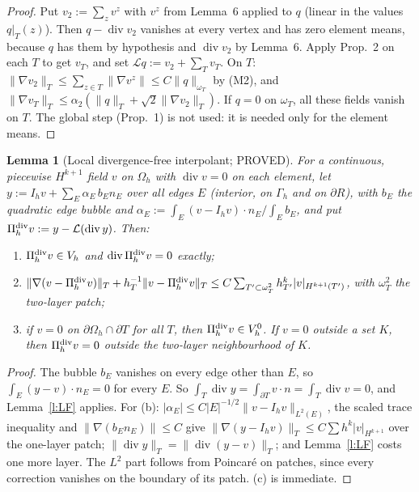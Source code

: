 \documentclass[11pt,reqno]{amsart}
\theoremstyle{plain}
\newtheorem{lemma}[theorem]{Lemma}
\theoremstyle{definition}
\newcommand{\Gh}{\Gamma_h}
\newcommand{\Oh}{\Omega_h}
\newcommand{\Vh}{V_h}
\newcommand{\VO}{V_h^0}
\newcommand{\norm}[1]{\lVert #1\rVert}
\renewcommand{\div}{\operatorname{div}}
\newcommand{\Pz}{\Pi^{\rm div}_h}   %
\begin{document}
\begin{proof}
Put $v_2:=\sum_zv^z$ with $v^z$ from Lemma~6 applied to $q$ (linear in the values $q|_T(z)$). Then $q-\div v_2$ vanishes at every vertex and has zero element means, because $q$ has them by hypothesis and $\div v_2$ by Lemma~6. Apply Prop.~2 on each $T$ to get $v_T$, and set $\mathcal Lq:=v_2+\sum_Tv_T$. On $T$: $\norm{\nabla v_2}_T\le\sum_{z\in T}\norm{\nabla v^z}\le C\norm q_{\omega_T}$ by (M2), and $\norm{\nabla v_T}_T\le\alpha_2(\norm q_T+\sqrt2\norm{\nabla v_2}_T)$. If $q=0$ on $\omega_T$, all these fields vanish on $T$. The global step (Prop.~1) is not used: it is needed only for the element means.
\end{proof}

\begin{lemma}[Local divergence-free interpolant; PROVED]\label{l:Pz}
For a continuous, piecewise $H^{k+1}$ field $v$ on $\Oh$ with $\div v=0$ on each element, let $y:=I_hv+\sum_E\alpha_E\,b_En_E$ over all edges $E$ (interior, on $\Gh$ and on $\partial R$), with $b_E$ the quadratic edge bubble and $\alpha_E:=\int_E(v-I_hv)\cdot n_E/\int_Eb_E$, and put $\Pz v:=y-\mathcal L(\div y)$. Then:
\begin{enumerate}[label=(\alph*)]
\item $\Pz v\in\Vh$ and $\div\Pz v=0$ exactly;
\item $\norm{\nabla(v-\Pz v)}_T+h_T^{-1}\norm{v-\Pz v}_T\le C\sum_{T'\subset\omega^2_T}h_{T'}^k|v|_{H^{k+1}(T')}$, with $\omega^2_T$ the two-layer patch;
\item if $v=0$ on $\partial\Oh\cap\partial T$ for all $T$, then $\Pz v\in\VO$. If $v=0$ outside a set $K$, then $\Pz v=0$ outside the two-layer neighbourhood of $K$.
\end{enumerate}
\end{lemma}

\begin{proof}
The bubble $b_E$ vanishes on every edge other than $E$, so $\int_E(y-v)\cdot n_E=0$ for every $E$. So $\int_T\div y=\int_{\partial T}v\cdot n=\int_T\div v=0$, and Lemma~\ref{l:LF} applies. For (b): $|\alpha_E|\le C|E|^{-1/2}\norm{v-I_hv}_{L^2(E)}$, the scaled trace inequality and $\norm{\nabla(b_En_E)}\le C$ give $\norm{\nabla(y-I_hv)}_T\le C\sum h^k|v|_{H^{k+1}}$ over the one-layer patch; $\norm{\div y}_T=\norm{\div(y-v)}_T$; and Lemma~\ref{l:LF} costs one more layer. The $L^2$ part follows from Poincar\'e on patches, since every correction vanishes on the boundary of its patch. (c) is immediate.
\end{proof}
\end{document}
